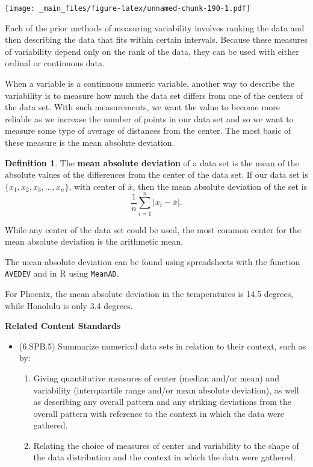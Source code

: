 \documentclass[
]{book}
\providecommand{\tightlist}{%
  \setlength{\itemsep}{0pt}\setlength{\parskip}{0pt}}
\newenvironment{standards}{}{}
\theoremstyle{definition}
\newtheorem{definition}{Definition}[chapter]
\theoremstyle{definition}
\theoremstyle{definition}
\theoremstyle{definition}
\theoremstyle{remark}
\begin{document}
\texttt{[image: \_main\_files/figure-latex/unnamed-chunk-190-1.pdf]}

Each of the prior methods of measuring variability involves ranking the data and then describing the data that fits within certain intervals. Because these measures of variability depend only on the rank of the data, they can be used with either ordinal or continuous data.

When a variable is a continuous numeric variable, another way to describe the variability is to measure how much the data set differs from one of the centers of the data set. With such measurements, we want the value to become more reliable as we increase the number of points in our data set and so we want to measure some type of average of distances from the center. The most basic of these measure is the mean absolute deviation.

\begin{definition}
The \textbf{mean absolute deviation} of a data set is the mean of the absolute values of the differences from the center of the data set. If our data set is \(\{x_1, x_2, x_3, \ldots, x_n\}\), with center of \(\overline{x}\), then the mean absolute deviation of the set is
\[\frac{1}{n} \sum_{i=1}^n |x_i-\overline{x}|.\]

While any center of the data set could be used, the most common center for the mean absolute deviation is the arithmetic mean.
\end{definition}

The mean absolute deviation can be found using spreadsheets with the function \texttt{AVEDEV} and in R using \texttt{MeanAD}.

For Phoenix, the mean absolute deviation in the temperatures is 14.5 degrees, while Honolulu is only 3.4 degrees.

\begin{standards}

\begin{center}
\textbf{Related Content Standards}

\end{center}

\begin{itemize}
\tightlist
\item
  (6.SPB.5) Summarize numerical data sets in relation to their context, such as by:

  \begin{enumerate}
  \def\labelenumi{\alph{enumi}.}
  \setcounter{enumi}{2}
  \tightlist
  \item
    Giving quantitative measures of center (median and/or mean) and variability (interquartile range and/or mean absolute deviation), as well as describing any overall pattern and any striking deviations from the overall pattern with reference to the context in which the data were gathered.
  \item
    Relating the choice of measures of center and variability to the shape of the data distribution and the context in which the data were gathered.
  \end{enumerate}
\end{itemize}

\end{standards}
\end{document}
